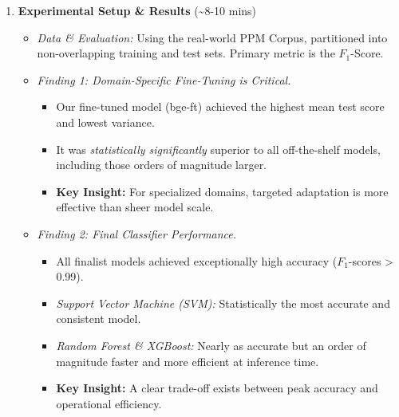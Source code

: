 \documentclass{article}
\begin{document}
\begin{enumerate}
    \item \textbf{Experimental Setup \& Results} (\textasciitilde8-10 mins)
    \begin{itemize}
        \item \textit{Data \& Evaluation:} Using the real-world PPM Corpus, partitioned into non-overlapping training and test sets. Primary metric is the $F_1$-Score.
        \item \textit{Finding 1: Domain-Specific Fine-Tuning is Critical.}
        \begin{itemize}
            \item Our fine-tuned model (bge-ft) achieved the highest mean test score and lowest variance.
            \item It was \textit{statistically significantly} superior to all off-the-shelf models, including those orders of magnitude larger.
            \item \textbf{Key Insight:} For specialized domains, targeted adaptation is more effective than sheer model scale.
        \end{itemize}
        \item \textit{Finding 2: Final Classifier Performance.}
        \begin{itemize}
            \item All finalist models achieved exceptionally high accuracy ($F_1$-scores > 0.99).
            \item \textit{Support Vector Machine (SVM):} Statistically the most accurate and consistent model.
            \item \textit{Random Forest \& XGBoost:} Nearly as accurate but an order of magnitude faster and more efficient at inference time.
            \item \textbf{Key Insight:} A clear trade-off exists between peak accuracy and operational efficiency.
        \end{itemize}
    \end{itemize}
    

\end{enumerate}
\end{document}
